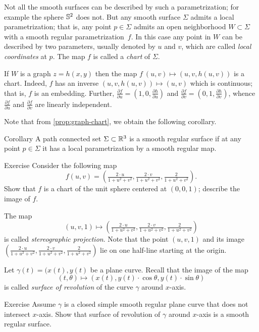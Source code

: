 Not all the smooth surfaces can be described by such a parametrization;
for example the sphere $\mathbb{S}^2$ does not.
But any smooth surface $\Sigma$ admits a local parametrization; that is, any point $p\in\Sigma$ admits an open neighborhood $W\subset \Sigma$ with a smooth regular parametrization~$f$.
In this case any point in $W$ can be described by two parameters, usually denoted by $u$ and $v$, 
which are called \emph{local coordinates} at $p$.
The map $f$ is called a \emph{chart} of $\Sigma$.

If $W$ is a graph $z=h(x,y)$ then the map $f\:(u,v)\mapsto (u,v,h(u,v))$ is a chart.
Indeed, $f$ has an inverse $(u,v,h(u,v))\mapsto (u,v)$ which is continuous;
that is, $f$ is an embedding.
Further,
$\tfrac{\partial f}{\partial u}=(1,0,\tfrac{\partial h}{\partial u})$ and $\tfrac{\partial f}{\partial v}=(0,1,\tfrac{\partial h}{\partial v})$, whence $\tfrac{\partial f}{\partial u}$ and $\tfrac{\partial f}{\partial v}$ are linearly independent.

Note that from \ref{prop:graph-chart}, we obtain the following corollary.

\begin{thm}{Corollary}
A path connected set $\Sigma\subset \mathbb{R}^3$ is a smooth regular surface if at any point $p\in \Sigma$ it has a local parametrization by a smooth regular map.
\end{thm}


\begin{thm}{Exercise}\label{ex:inversion}
Consider the following map 
\[f(u,v)=(\tfrac{2\cdot u}{1+u^2+v^2},\tfrac{2\cdot v}{1+u^2+v^2},\tfrac{2}{1+u^2+v^2}).\]
Show that $f$ is a chart of the unit sphere centered at $(0,0,1)$; describe the image of $f$.
\end{thm}

The map 
\[(u,v,1)\mapsto (\tfrac{2\cdot u}{1+u^2+v^2},\tfrac{2\cdot v}{1+u^2+v^2},\tfrac{2}{1+u^2+v^2})\]
is called \emph{stereographic projection}. 
Note that the point $(u,v,1)$ and its image $(\tfrac{2\cdot u}{1+u^2+v^2},\tfrac{2\cdot v}{1+u^2+v^2},\tfrac{2}{1+u^2+v^2})$ lie on one half-line starting at the origin.

Let $\gamma(t)=(x(t),y(t)$ be a plane curve.
Recall that the image of the map 
\[(t,\theta)\mapsto (x(t), y(t)\cdot\cos\theta,y(t)\cdot\sin\theta)\] 
is called \emph{surface of revolution} of the curve $\gamma$ around $x$-axis.

\begin{thm}{Exercise}\label{ex:revolution}
Assume $\gamma$ is a closed simple smooth regular plane curve that does not intersect $x$-axis.
Show that surface of revolution of $\gamma$ around $x$-axis is a smooth regular surface.
\end{thm}


